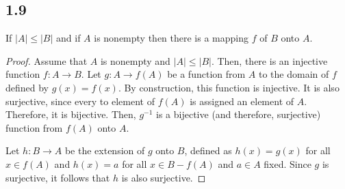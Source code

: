 \subsection*{1.9} If $|A| \leq |B|$ and if $A$ is nonempty then there is a mapping $f$ of $B$ onto $A$.

\begin{proof}
Assume that $A$ is nonempty and $|A| \leq |B|$. Then, there is an injective function $f:A \rightarrow B$. Let $g:A \rightarrow f(A)$ be a function from $A$ to the domain of $f$ defined by $g(x) = f(x)$. By construction, this function is injective. It is also surjective, since every to element of $f(A)$ is assigned an element of $A$. Therefore, it is bijective. Then, $g^{-1}$ is a bijective (and therefore, surjective) function from $f(A)$ onto $A$.

Let $h:B \rightarrow A$ be the extension of $g$ onto $B$, defined as $h(x) = g(x)$ for all $x \in f(A)$ and $h(x) = a$ for all $x \in B - f(A)$ and $a \in A$ fixed. Since $g$ is surjective, it follows that $h$ is also surjective.
\end{proof}

